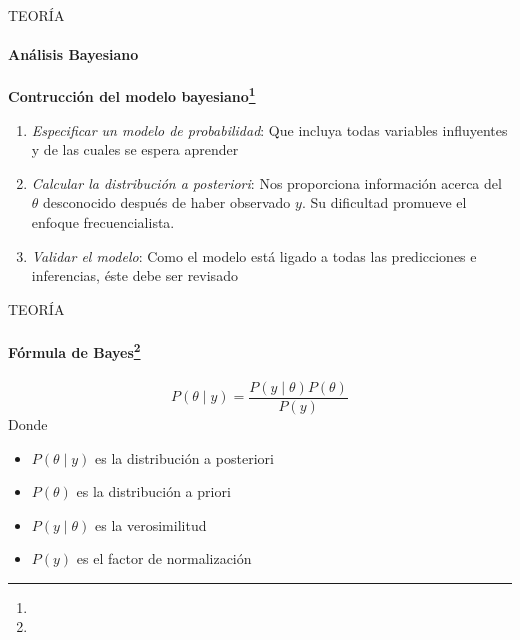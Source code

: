 \begin{frame}{TEORÍA}
    \framesubtitle{Análisis Bayesiano}
    \textbf{Contrucción del modelo bayesiano\footnote{}}

    \begin{enumerate}
        \item \textit{Especificar un modelo de probabilidad}: Que incluya todas variables influyentes y de las cuales se espera aprender
        \item \textit{Calcular la distribución a posteriori}: Nos proporciona información acerca del $\theta$ desconocido después de haber observado $y$. Su dificultad promueve el enfoque frecuencialista.
        \item \textit{Validar el modelo}: Como el modelo está ligado a todas las predicciones e inferencias, éste debe ser revisado
    \end{enumerate}
\end{frame}

\begin{frame}{TEORÍA}
    \framesubtitle{Fórmula de Bayes\footnote{}}
    \begin{equation}
        P(\theta\mid y)=\frac{P(y\mid\theta)P(\theta)}{P(y)}
    \end{equation}
    Donde
    \begin{itemize}
        \item $P(\theta\mid y)$ es la distribución a posteriori
        \item $P(\theta)$ es la distribución a priori
        \item $P(y\mid\theta)$ es la verosimilitud
        \item $P(y)$ es el factor de normalización
    \end{itemize}
\end{frame}
